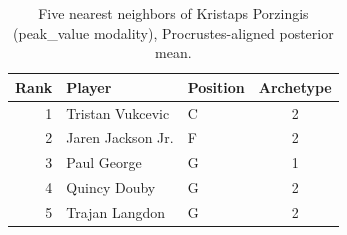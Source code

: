\begin{table}[htbp]
  \centering\small
  \begin{tabular}{rllc}
    \toprule
    Rank & Player & Position & Archetype \\
    \midrule
    1 & Tristan Vukcevic & C & 2 \\
    2 & Jaren Jackson Jr. & F & 2 \\
    3 & Paul George & G & 1 \\
    4 & Quincy Douby & G & 2 \\
    5 & Trajan Langdon & G & 2 \\
    \bottomrule
  \end{tabular}
  \caption{Five nearest neighbors of Kristaps Porzingis (peak_value modality), Procrustes-aligned posterior mean.}
  \label{tab:Kristaps_Porzingis_neighbors_peak_value}
\end{table}

